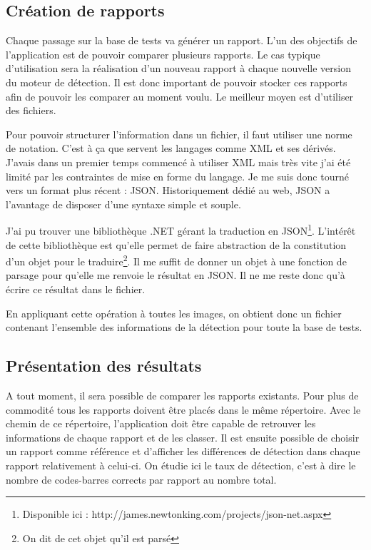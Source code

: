 \subsection{Création de rapports}

Chaque passage sur la base de tests va générer un rapport. L'un des objectifs de l'application est de pouvoir comparer plusieurs rapports. Le cas typique d'utilisation sera la réalisation d'un nouveau rapport à chaque nouvelle version du moteur de détection. Il est donc important de pouvoir stocker ces rapports afin de pouvoir les comparer au moment voulu. Le meilleur moyen est d'utiliser des fichiers.

Pour pouvoir structurer l'information dans un fichier, il faut utiliser une norme de notation. C'est à ça que servent les langages comme XML et ses dérivés. J'avais dans un premier temps commencé à utiliser XML mais très vite j'ai été limité par les contraintes de mise en forme du langage. Je me suis donc tourné vers un format plus récent : JSON. Historiquement dédié au web, JSON a l'avantage de disposer d'une syntaxe simple et souple.

J'ai pu trouver une bibliothèque .NET gérant la traduction en JSON\footnote{Disponible ici : http://james.newtonking.com/projects/json-net.aspx}. L'intérêt de cette bibliothèque est qu'elle permet de faire abstraction de la constitution d'un objet pour le traduire\footnote{On dit de cet objet qu'il est \og parsé \fg{} }. Il me suffit de donner un objet à une fonction de parsage pour qu'elle me renvoie le résultat en JSON. Il ne me reste donc qu'à écrire ce résultat dans le fichier.

En appliquant cette opération à toutes les images, on obtient donc un fichier contenant l'ensemble des informations de la détection pour toute la base de tests.

\subsection{Présentation des résultats}

A tout moment, il sera possible de comparer les rapports existants. Pour plus de commodité tous les rapports doivent être placés dans le même répertoire. Avec le chemin de ce répertoire, l'application doit être capable de retrouver les informations de chaque rapport et de les classer. Il est ensuite possible de choisir un rapport comme référence et d'afficher les différences de détection dans chaque rapport relativement à celui-ci. On étudie ici le taux de détection, c'est à dire le nombre de codes-barres corrects par rapport au nombre total.



